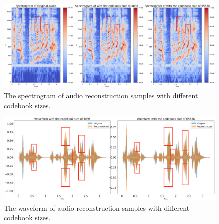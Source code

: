 \begin{figure}[h]
    \centering
    \includegraphics[width=2.0\columnwidth]{material/spec.png}
    \caption{The spectrogram of audio reconstruction samples with different codebook sizes.}
    \label{fig:spec}
\end{figure}

\begin{figure}[h]
    \centering
    \includegraphics[width=2.0\columnwidth]{material/waveform.png}
    \caption{The waveform of audio reconstruction samples with different codebook sizes.}
    \label{fig:waveform}
\end{figure}

